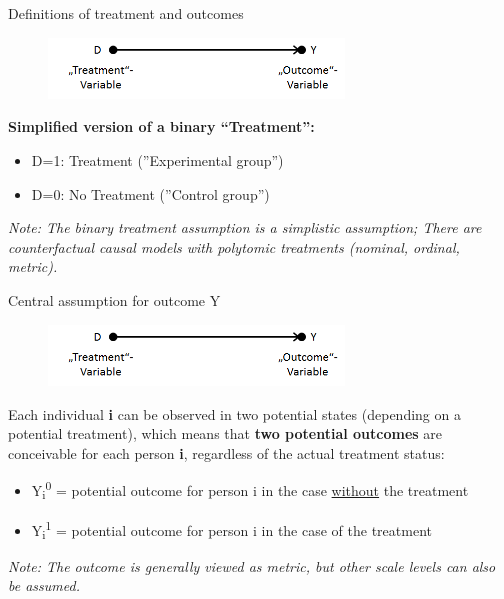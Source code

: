 \documentclass{beamer}\usepackage[]{graphicx}\usepackage[]{color}
\begin{document}
\begin{frame}{Definitions of treatment and outcomes}
  \begin{figure}
	\centering
	\includegraphics[width=0.7\textwidth]{Graphics/D_on_Y_names.png}
  \end{figure}
\textbf{Simplified version of a binary “Treatment”:}
  \begin{itemize}
    \item D=1:	Treatment (''Experimental group'')
    \item D=0: No Treatment (''Control group'')
  \end{itemize}
\textit{Note: The binary treatment assumption is a simplistic assumption; There are counterfactual causal models with polytomic treatments (nominal, ordinal, metric).}
\end{frame}


\begin{frame}{Central assumption for outcome Y}
  \begin{figure}
	\centering
	\includegraphics[width=0.7\textwidth]{Graphics/D_on_Y_names.png}
  \end{figure}
Each individual \textbf{i} can be observed in two potential states (depending on a potential treatment), which means that \textbf{two potential outcomes} are conceivable for each person \textbf{i}, regardless of the actual treatment status:
  \begin{itemize}
    \item Y\textsubscript{i}\textsuperscript{0} = potential outcome for person i in the case \underline{without} the treatment
    \item Y\textsubscript{i}\textsuperscript{1} = potential outcome for person i in the case of the treatment
  \end{itemize}
\textit{Note: The outcome is generally viewed as metric, but other scale levels can also be assumed.}
\end{frame}
\end{document}
